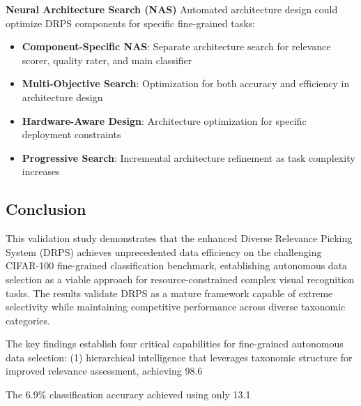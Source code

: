 \documentclass[12pt]{article}
\begin{document}
\textbf{Neural Architecture Search (NAS)}
Automated architecture design could optimize DRPS components for specific fine-grained tasks:

\begin{itemize}
\item \textbf{Component-Specific NAS}: Separate architecture search for relevance scorer, quality rater, and main classifier
\item \textbf{Multi-Objective Search}: Optimization for both accuracy and efficiency in architecture design
\item \textbf{Hardware-Aware Design}: Architecture optimization for specific deployment constraints
\item \textbf{Progressive Search}: Incremental architecture refinement as task complexity increases
\end{itemize}

\subsection{Conclusion}\label{conclusion}

This validation study demonstrates that the enhanced Diverse Relevance Picking System (DRPS) achieves unprecedented data efficiency on the challenging CIFAR-100 fine-grained classification benchmark, establishing autonomous data selection as a viable approach for resource-constrained complex visual recognition tasks. The results validate DRPS as a mature framework capable of extreme selectivity while maintaining competitive performance across diverse taxonomic categories.

The key findings establish four critical capabilities for fine-grained autonomous data selection: (1) hierarchical intelligence that leverages taxonomic structure for improved relevance assessment, achieving 98.6%

The 6.9\% classification accuracy achieved using only 13.1%
\end{document}
